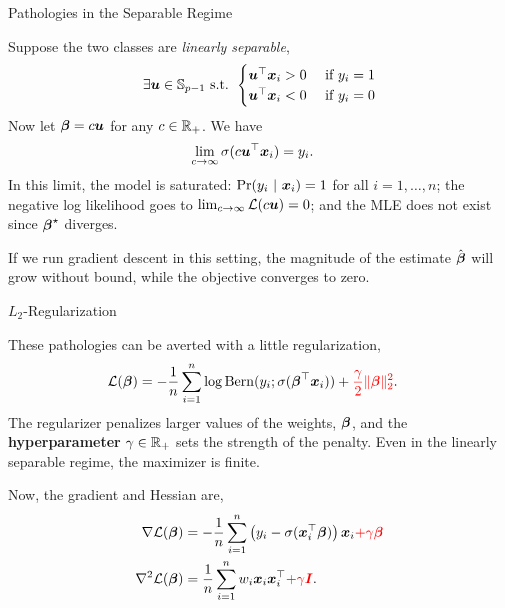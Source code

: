 \documentclass[aspectratio=169]{beamer}
\begin{document}
\begin{frame}[t,allowframebreaks]{Pathologies in the Separable
Regime}\label{pathologies-in-the-separable-regime}

Suppose the two classes are \emph{linearly separable}, \begin{align*}
\exists \boldsymbol{u} \in \mathbb{S}_{p-1} \text{ s.t. } 
\begin{cases}
\boldsymbol{u}^\top \boldsymbol{x}_i > 0 & \text{ if } y_i = 1 \\
\boldsymbol{u}^\top \boldsymbol{x}_i < 0 &\text{ if } y_i = 0
\end{cases}
\end{align*} Now let \(\boldsymbol{\beta} = c \boldsymbol{u}\) for any \(c \in \mathbb{R}_+\). We
have \begin{align*}
\lim_{c \to \infty} \sigma(c \boldsymbol{u}^\top \boldsymbol{x}_i) &= y_i.
\end{align*} In this limit, the model is saturated:
\(\Pr(y_i ~\vert~ \boldsymbol{x}_i) = 1\) for all \(i=1,\ldots,n\); the negative log
likelihood goes to \(\lim_{c \to \infty} \mathcal{L}(c \boldsymbol{u}) = 0\); and the MLE
does not exist since \(\boldsymbol{\beta}^\star\) diverges.

If we run gradient descent in this setting, the magnitude of the
estimate \(\hat{\boldsymbol{\beta}}\) will grow without bound, while the objective
converges to zero. 
\end{frame}

\begin{frame}[t,allowframebreaks]{\texorpdfstring{\(L_2\)-Regularization}{L\_2-Regularization}}\label{l_2-regularization}

These pathologies can be averted with a little regularization,
\begin{align*}
\mathcal{L}(\boldsymbol{\beta}) 
&= - \frac{1}{n} \sum_{i=1}^n \log \mathrm{Bern}(y_i; \sigma(\boldsymbol{\beta}^\top \boldsymbol{x}_i)) + \textcolor{red}{\frac{\gamma}{2} \|\boldsymbol{\beta}\|_2^2}.
\end{align*} The regularizer penalizes larger values of the weights,
\(\boldsymbol{\beta}\), and the \textbf{hyperparameter} \(\gamma \in \mathbb{R}_+\)
sets the strength of the penalty. Even in the linearly separable regime,
the maximizer is finite.

Now, the gradient and Hessian are, \begin{align*}
\nabla \mathcal{L}(\boldsymbol{\beta}) 
&= -\frac{1}{n}  \sum_{i=1}^n \left(y_i - \sigma(\boldsymbol{x}_i^\top \boldsymbol{\beta}) \right) \boldsymbol{x}_i \textcolor{red}{+ \gamma \boldsymbol{\beta}} \\
\nabla^2 \mathcal{L}(\boldsymbol{\beta}) 
&= \frac{1}{n} \sum_{i=1}^n w_i \boldsymbol{x}_i \boldsymbol{x}_i^\top \textcolor{red}{+ \gamma \boldsymbol{I}}. 
\end{align*}
\end{frame}
\end{document}
